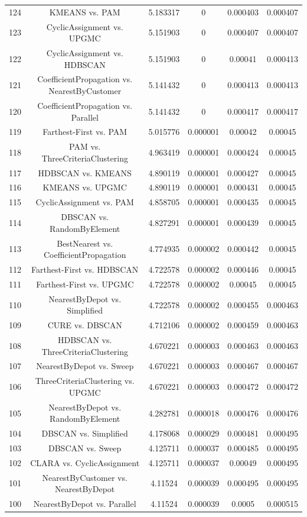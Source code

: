 \documentclass[a4paper,10pt]{article}
\begin{document}
\begin{landscape}
\begin{table}[!htp]
\begin{tabular}{cccccc}
124&KMEANS vs. PAM&5.183317&0&0.000403&0.000407\\
123&CyclicAssignment vs. UPGMC&5.151903&0&0.000407&0.000407\\
122&CyclicAssignment vs. HDBSCAN&5.151903&0&0.00041&0.000413\\
121&CoefficientPropagation vs. NearestByCustomer&5.141432&0&0.000413&0.000413\\
120&CoefficientPropagation vs. Parallel&5.141432&0&0.000417&0.000417\\
119&Farthest-First vs. PAM&5.015776&0.000001&0.00042&0.00045\\
118&PAM vs. ThreeCriteriaClustering&4.963419&0.000001&0.000424&0.00045\\
117&HDBSCAN vs. KMEANS&4.890119&0.000001&0.000427&0.00045\\
116&KMEANS vs. UPGMC&4.890119&0.000001&0.000431&0.00045\\
115&CyclicAssignment vs. PAM&4.858705&0.000001&0.000435&0.00045\\
114&DBSCAN vs. RandomByElement&4.827291&0.000001&0.000439&0.00045\\
113&BestNearest vs. CoefficientPropagation&4.774935&0.000002&0.000442&0.00045\\
112&Farthest-First vs. HDBSCAN&4.722578&0.000002&0.000446&0.00045\\
111&Farthest-First vs. UPGMC&4.722578&0.000002&0.00045&0.00045\\
110&NearestByDepot vs. Simplified&4.722578&0.000002&0.000455&0.000463\\
109&CURE vs. DBSCAN&4.712106&0.000002&0.000459&0.000463\\
108&HDBSCAN vs. ThreeCriteriaClustering&4.670221&0.000003&0.000463&0.000463\\
107&NearestByDepot vs. Sweep&4.670221&0.000003&0.000467&0.000467\\
106&ThreeCriteriaClustering vs. UPGMC&4.670221&0.000003&0.000472&0.000472\\
105&NearestByDepot vs. RandomByElement&4.282781&0.000018&0.000476&0.000476\\
104&DBSCAN vs. Simplified&4.178068&0.000029&0.000481&0.000495\\
103&DBSCAN vs. Sweep&4.125711&0.000037&0.000485&0.000495\\
102&CLARA vs. CyclicAssignment&4.125711&0.000037&0.00049&0.000495\\
101&NearestByCustomer vs. NearestByDepot&4.11524&0.000039&0.000495&0.000495\\
100&NearestByDepot vs. Parallel&4.11524&0.000039&0.0005&0.000515\\

\end{tabular}
\end{table}
\end{landscape}
\end{document}
